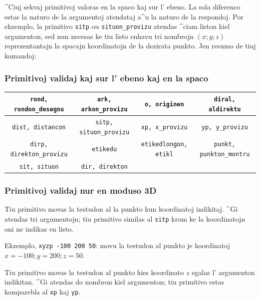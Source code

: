 ^Ciuj sekvaj primitivoj valoras en la spaco kaj sur l' ebeno.  La sola
diferenco estas la naturo de la argumentoj atendataj a^u la naturo de
la respondoj.  Por ekzemplo, la primitivo \texttt{sitp} ou
\texttt{situon\_provizu} atendas ^ciam liston kiel argumenton, sed nun
necesas ke tiu listo enhavu tri nombrojn $(x;y;z)$ reprezentantajn la
spacajn koordinatojn de la dezirata punkto.  Jen resumo de tiuj
komandoj:

\subsubsection{Primitivoj validaj kaj sur l' ebeno kaj en la spaco}

\begin{center}
  \begin{tabular}{|cccc|}
    \hline
    \texttt{rond, rondon\_desegnu}&
    \texttt{ark, arkon\_provizu}&
    \texttt{o, originen}&
    \texttt{diral, aldirektu}\\
    \hline
    \texttt{dist, distancon}&
    \texttt{sitp, situon\_provizu}&
    \texttt{xp, x\_provizu}&
    \texttt{yp, y\_provizu}\\
    \hline
    \texttt{dirp, direkton\_provizu}&
    \texttt{etikedu}&
    \texttt{etikedlongon, etikl}&
    \texttt{punkt, punkton\_montru}\\
    \hline
    \texttt{sit, situon}&
    \texttt{dir, direkton} & &\\
    \hline
  \end{tabular} 
\end{center}

\subsubsection{Primitivoj validaj nur en moduso 3D}


Tiu primitivo movas la testudon al la punkto kun koordinatoj
indikitaj.  ^Gi atendas tri argumentojn; tiu primitivo similas al
\texttt{sitp} krom ke la koordinatojn oni ne indikas en listo. 

Ekzemplo, \texttt{xyzp -100 200 50}: movu la testudon al punkto je
koordinatoj $x=-100;y=200;z=50$.


Tiu primitivo movas la testudon al punkto kies koordinato $z$ egalas
l' argumenton indikitan.  ^Gi atendas do nombron kiel argumenton; tiu
primitivo estas komparebla al \texttt{xp} kaj \texttt{yp}.

